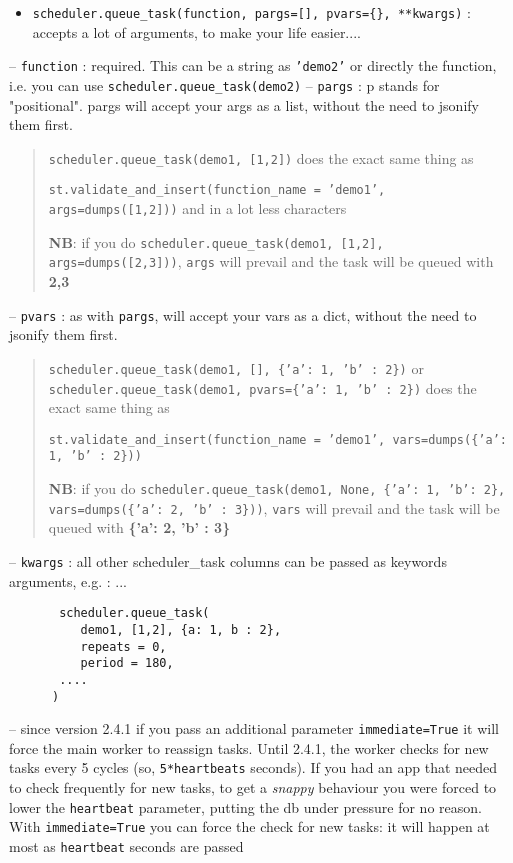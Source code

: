 \documentclass[justified,sixbynine,notoc]{tufte-book}
\def\ft{\small\tt}
\begin{document}
\begin{fullwidth}
\begin{itemize}
\item {\ft scheduler.queue\_task(function, pargs=[], pvars=\{\}, **kwargs)} : accepts a lot of arguments, to make your life easier....
\end{itemize}
-- {\ft function} : required. This can be a string as {\ft 'demo2'} or directly the function, i.e. you can use {\ft scheduler.queue\_task(demo2)}
-- {\ft pargs} : p stands for "positional". pargs will accept your args as a list, without the need to jsonify them first.
\begin{quote}{\ft scheduler.queue\_task(demo1, [1,2])}
\noindent does the exact same thing as

{\ft st.validate\_and\_insert(function\_name = 'demo1', args=dumps([1,2]))}
\noindent and in a lot less characters

{\bf NB}: if you do {\ft scheduler.queue\_task(demo1, [1,2], args=dumps([2,3]))}, {\ft args} will prevail and the task will be queued with {\bf 2,3}\end{quote}-- {\ft pvars} : as with {\ft pargs}, will accept your vars as a dict, without the need to jsonify them first.
\begin{quote}{\ft scheduler.queue\_task(demo1, [], \{'a': 1, 'b' : 2\})} or {\ft scheduler.queue\_task(demo1, pvars=\{'a': 1, 'b' : 2\})}
\noindent does the exact same thing as

{\ft st.validate\_and\_insert(function\_name = 'demo1', vars=dumps(\{'a': 1, 'b' : 2\}))}

{\bf NB}:  if you do {\ft scheduler.queue\_task(demo1, None, \{'a': 1, 'b': 2\}, vars=dumps(\{'a': 2, 'b' : 3\}))}, {\ft vars} will prevail and the task will be queued with {\bf \{'a': 2, 'b' : 3\}}\end{quote}-- {\ft kwargs} : all other scheduler\_task columns can be passed as keywords arguments, e.g. :
... \begin{lstlisting}
       scheduler.queue_task(
          demo1, [1,2], {a: 1, b : 2},
          repeats = 0,
          period = 180,
       ....
      )
\end{lstlisting}
-- since version 2.4.1 if you pass an additional parameter {\ft immediate=True} it will force the main worker to reassign tasks. Until 2.4.1, the worker checks for new tasks every 5 cycles (so, {\ft 5*heartbeats} seconds). If you had an app that needed to check frequently for new tasks, to get a {\it snappy} behaviour you were forced to lower the {\ft heartbeat} parameter, putting the db under pressure for no reason. With {\ft immediate=True} you can force the check for new tasks: it will happen at most as {\ft heartbeat} seconds are passed


\end{fullwidth}
\end{document}
